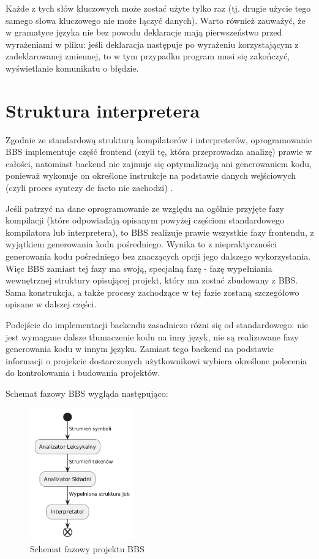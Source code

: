 Każde z tych słów kluczowych może zostać użyte tylko raz (tj. drugie użycie tego samego słowa kluczowego nie może łączyć danych). Warto również zauważyć, że w gramatyce języka nie bez powodu deklaracje mają pierwszeństwo przed wyrażeniami w pliku: jeśli deklaracja następuje po wyrażeniu korzystającym z zadeklarowanej zmiennej, to w tym przypadku program musi się zakończyć, wyświetlanie komunikatu o błędzie.

\section{Struktura interpretera}
Zgodnie ze standardową strukturą kompilatorów i interpreterów, oprogramowanie BBS implementuje część frontend (czyli tę, która przeprowadza analizę) prawie w całości, natomiast backend nie zajmuje się optymalizacją ani generowaniem kodu, ponieważ wykonuje on określone instrukcje na podstawie danych wejściowych (czyli proces syntezy de facto nie zachodzi) \cite{compilers}.

Jeśli patrzyć na dane oprogramowanie ze względu na ogólnie przyjęte fazy kompilacji (które odpowiadają opisanym powyżej częściom standardowego kompilatora lub interpretera), to BBS realizuje prawie wszystkie fazy frontendu, z wyjątkiem generowania kodu pośredniego. Wynika to z niepraktyczności generowania kodu pośredniego bez znaczących opcji jego dalszego wykorzystania. Więc BBS zamiast tej fazy ma swoją, specjalną fazę - fazę wypełniania wewnętrznej struktury opisującej projekt, który ma zostać zbudowany z BBS. Sama konstrukcja, a także procesy zachodzące w tej fazie zostaną szczegółowo opisane w dalszej części.

Podejście do implementacji backendu zasadniczo różni się od standardowego: nie jest wymagane dalsze tłumaczenie kodu na inny język, nie są realizowane fazy generowania kodu w innym języku. Zamiast tego backend na podstawie informacji o projekcie dostarczonych użytkownikowi wybiera określone polecenia do kontrolowania i budowania projektów.

Schemat fazowy BBS wygląda następująco:

\begin{figure}[h]
    \caption{Schemat fazowy projektu BBS}
    \centering
    \includegraphics[width=0.4\textwidth]{Images/phases.png}
\end{figure}

